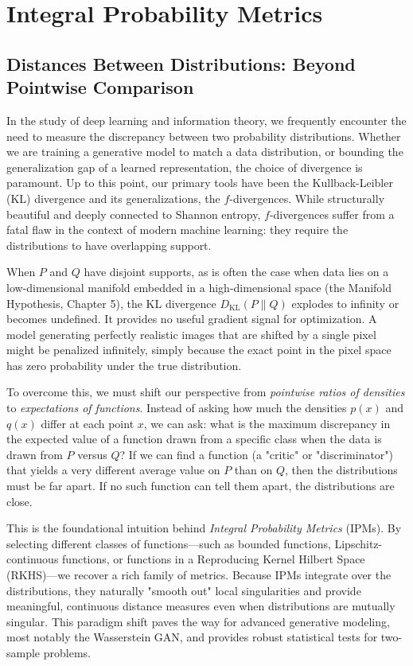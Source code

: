 \chapter{Integral Probability Metrics}
\label{ch:ipm}

\section{Distances Between Distributions: Beyond Pointwise Comparison}

In the study of deep learning and information theory, we frequently encounter the need to measure the discrepancy between two probability distributions. Whether we are training a generative model to match a data distribution, or bounding the generalization gap of a learned representation, the choice of divergence is paramount. Up to this point, our primary tools have been the Kullback-Leibler (KL) divergence and its generalizations, the $f$-divergences. While structurally beautiful and deeply connected to Shannon entropy, $f$-divergences suffer from a fatal flaw in the context of modern machine learning: they require the distributions to have overlapping support. 

When $P$ and $Q$ have disjoint supports, as is often the case when data lies on a low-dimensional manifold embedded in a high-dimensional space (the Manifold Hypothesis, Chapter 5), the KL divergence $D_{\text{KL}}(P \parallel Q)$ explodes to infinity or becomes undefined. It provides no useful gradient signal for optimization. A model generating perfectly realistic images that are shifted by a single pixel might be penalized infinitely, simply because the exact point in the pixel space has zero probability under the true distribution.

To overcome this, we must shift our perspective from \textit{pointwise ratios of densities} to \textit{expectations of functions}. Instead of asking how much the densities $p(x)$ and $q(x)$ differ at each point $x$, we can ask: what is the maximum discrepancy in the expected value of a function drawn from a specific class when the data is drawn from $P$ versus $Q$? If we can find a function (a "critic" or "discriminator") that yields a very different average value on $P$ than on $Q$, then the distributions must be far apart. If no such function can tell them apart, the distributions are close.

This is the foundational intuition behind \textit{Integral Probability Metrics} (IPMs). By selecting different classes of functions---such as bounded functions, Lipschitz-continuous functions, or functions in a Reproducing Kernel Hilbert Space (RKHS)---we recover a rich family of metrics. Because IPMs integrate over the distributions, they naturally "smooth out" local singularities and provide meaningful, continuous distance measures even when distributions are mutually singular. This paradigm shift paves the way for advanced generative modeling, most notably the Wasserstein GAN, and provides robust statistical tests for two-sample problems.


